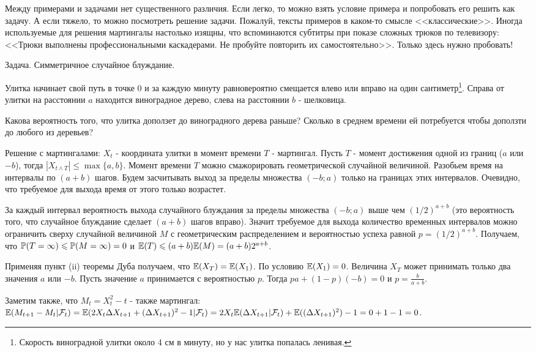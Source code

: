 {Между примерами и задачами нет существенного различия. Если легко, то можно взять условие примера и попробовать его решить как задачу. А если тяжело, то можно посмотреть решение задачи. Пожалуй, тексты примеров в каком-то смысле <<классические>>. Иногда используемые для решения мартингалы настолько изящны, что вспоминаются субтитры при показе сложных трюков по телевизору: <<Трюки выполнены профессиональными каскадерами. Не пробуйте повторить их самостоятельно>>. Только здесь нужно пробовать!



Задача. Симметричное случайное блуждание.

Улитка начинает свой путь в точке 0 и за каждую минуту равновероятно смещается влево или вправо на один сантиметр\footnote{Скорость виноградной улитки около 4 см в минуту, но у нас улитка попалась ленивая.}. Справа от улитки на расстоянии $a$ находится виноградное дерево, слева на расстоянии $b$ - шелковица.

Какова вероятность того, что улитка доползет до виноградного дерева раньше? Сколько в среднем времени ей потребуется чтобы доползти до любого из деревьев?

Решение с мартингалами: $X_{t}$ - координата улитки в момент времени $T$ - мартингал. Пусть $T$ - момент достижения одной из границ ($a$ или $-b$), тогда $|X_{t\wedge T}|\leq \max\{a,b\}$. Момент времени $T$ можно смажорировать геометрической случайной величиной. Разобьем время на интервалы по $(a+b)$ шагов. Будем засчитывать выход за пределы множества $(-b;a)$ только на границах этих интервалов. Очевидно, что требуемое для выхода время от этого только возрастет.

За каждый интервал вероятность выхода случайного блуждания за пределы множества $(-b;a)$ выше чем $(1/2)^{a+b}$ (это вероятность того, что случайное блуждание сделает $(a+b)$ шагов вправо). Значит требуемое для выхода количество временных интервалов можно ограничить сверху случайной величиной $M$ с геометрическим распределением и вероятностью успеха равной $p=(1/2)^{a+b}$. Получаем, что $\P(T=\infty)\leq \P(M=\infty)=0$ и $\E(T)\leq (a+b) \E(M)=(a+b) 2^{a+b}$.

Применяя пункт (ii) теоремы Дуба получаем, что $\E(X_{T})=\E(X_{1})$. По условию $\E(X_{1})=0$. Величина $X_{T}$ может принимать только два значения $a$ или $-b$. Пусть значение $a$ принимается с вероятностью $p$. Тогда $pa+(1-p)(-b)=0$ и $p=\frac{b}{a+b}$.

Заметим также, что $M_{t}=X^{2}_{t}-t$ - также мартингал: $\E(M_{t+1}-M_{t}|\mathcal{F}_{t})=\E(2X_{t}\Delta X_{t+1}+(\Delta X_{t+1})^{2}-1|\mathcal{F}_{t})=2X_{t}\E(\Delta X_{t+1}|\mathcal{F}_{t})+\E((\Delta X_{t+1})^{2})-1=0+1-1=0$.

}
